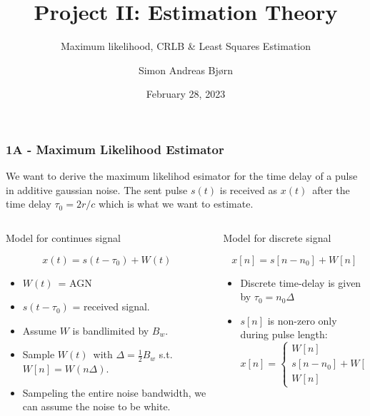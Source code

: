 \documentclass[compress]{beamer}
\title{Project II: Estimation Theory}
\subtitle{Maximum likelihood, CRLB \& Least Squares Estimation}
\author{\Large Simon Andreas Bjørn}
\date{\large February 28, 2023}
\begin{document}
\begin{frame}
    \maketitle
\end{frame}

\begin{frame} %
    \frametitle{1A - Maximum Likelihood Estimator}
    We want to derive the maximum likelihod esimator for the time delay of a pulse
    in additive gaussian noise. The sent pulse $s(t)$ is received as $x(t)$ after
    the time delay $\tau_0 = 2r/c$ which is what we want to estimate.
    \medskip
    \begin{columns}[t]
        \begin{column}{0.4\textwidth}
            \centerline{Model for continues signal}
            \begin{equation*}
                x(t) = s(t-\tau_0) + W(t)
            \end{equation*}

            \begin{itemize}
                \item $W(t)$ = AGN
                \item $s(t-\tau_0)$ = received signal. 
                \item Assume $W$ is bandlimited by $B_w$.
                \item Sample $W(t)$ with $\Delta=\frac{1}{2}B_w$ s.t. $W[n]=W(n\Delta)$.
                \item Sampeling the entire noise bandwidth, we can assume the noise to be
                white. 
            \end{itemize}
        \end{column}
        \begin{column}{0.7\textwidth}
            \centerline{Model for discrete signal}
            \begin{equation*}
                x[n] = s[n-n_0] + W[n]
            \end{equation*}
            \begin{itemize}
                \item Discrete time-delay is given by $\tau_0=n_0\Delta$
                \item $s[n]$ is non-zero only during pulse length: \\
                    \begin{equation*}
                        x[n] = 
                        \begin{cases}
                            W[n] & , 0 \le n \le n_0-1 \\
                            s[n-n_0]+W[n] & , n_0 \le n < n_0 + M \\
                            W[n] & , n_0 + M \le n \le N
                        \end{cases}
                    \end{equation*}
            \end{itemize}
        \end{column}
    \end{columns}
\end{frame} %
\end{document}
